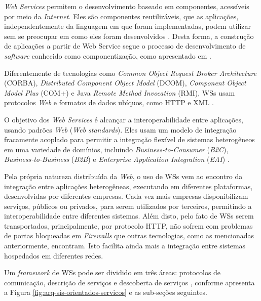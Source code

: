 \textit{Web Services} permitem o desenvolvimento baseado em componentes, acessíveis por meio da \textit{Internet}. Eles são componentes reutilizáveis, que as aplicações, independentemente da linguagem em que foram implementadas, podem utilizar sem se preocupar em como eles foram desenvolvidos \cite{vilas2007providing}. Desta forma, a construção de aplicações a partir de Web Service segue o processo de desenvolvimento
de \textit{software} conhecido como componentização, como apresentado em \cite{sommerville2011soft}.

Diferentemente de tecnologias como \textit{Common Object Request Broker Architecture} (CORBA), \textit{Distributed Component Object Model} (DCOM), \textit{Component Object Model Plus} (COM+) e 
Java \textit{Remote Method Invocation} (RMI), WSs usam protocolos \textit{Web} e formatos de dados ubíquos, como HTTP e XML \cite{vilas2007providing}. 

O objetivo dos \textit{Web Services} é alcançar a interoperabilidade entre aplicações, usando padrões \textit{Web}
(\textit{Web standards}). Eles usam um modelo de integração fracamente acoplado para permitir
a integração flexível de sistemas heterogêneos em uma variedade de domínios, 
incluindo \textit{Business-to-Consumer} (\textit{B2C}),
\textit{Business-to-Business} (\textit{B2B})
e \textit{Enterprise Application Integration} (\textit{EAI}) \cite{oasis-wsbpel}.


Pela própria natureza distribuída da \textit{Web}, o uso de WSs vem ao encontro da integração entre aplicações heterogêneas, executando em diferentes plataformas, desenvolvidas por diferentes empresas. Cada vez mais empresas disponibilizam serviços, públicos ou privados, para serem utilizados por terceiros, permitindo a interoperabilidade entre diferentes sistemas. Além disto, pelo fato de WSs serem transportados, principalmente, por protocolo HTTP, não sofrem com problemas de portas bloqueadas em \textit{Firewalls} que outras tecnologias, como as mencionadas anteriormente, encontram.
Isto facilita ainda mais a integração entre sistemas hospedados em diferentes redes.

Um \textit{framework} de WSs pode ser dividido em três áreas: protocolos de comunicação,
descrição de serviços e descoberta de serviços \cite{sommerville2011soft}, conforme apresenta 
a Figura \ref{fig:arq-sis-orientados-servicos} e as sub-seções seguintes.

